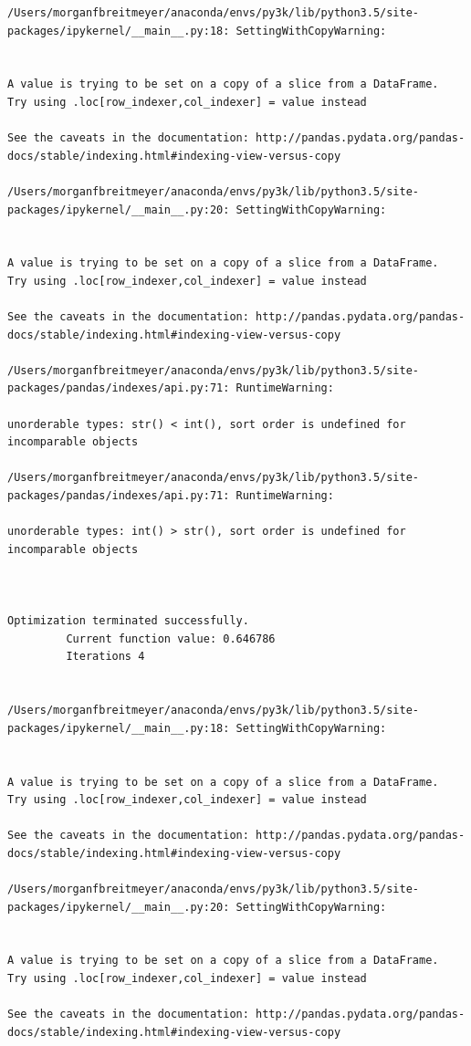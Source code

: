 \begin{lstlisting}
/Users/morganfbreitmeyer/anaconda/envs/py3k/lib/python3.5/site-packages/ipykernel/__main__.py:18: SettingWithCopyWarning:


A value is trying to be set on a copy of a slice from a DataFrame.
Try using .loc[row_indexer,col_indexer] = value instead

See the caveats in the documentation: http://pandas.pydata.org/pandas-docs/stable/indexing.html#indexing-view-versus-copy

/Users/morganfbreitmeyer/anaconda/envs/py3k/lib/python3.5/site-packages/ipykernel/__main__.py:20: SettingWithCopyWarning:


A value is trying to be set on a copy of a slice from a DataFrame.
Try using .loc[row_indexer,col_indexer] = value instead

See the caveats in the documentation: http://pandas.pydata.org/pandas-docs/stable/indexing.html#indexing-view-versus-copy

/Users/morganfbreitmeyer/anaconda/envs/py3k/lib/python3.5/site-packages/pandas/indexes/api.py:71: RuntimeWarning:

unorderable types: str() < int(), sort order is undefined for incomparable objects

/Users/morganfbreitmeyer/anaconda/envs/py3k/lib/python3.5/site-packages/pandas/indexes/api.py:71: RuntimeWarning:

unorderable types: int() > str(), sort order is undefined for incomparable objects



Optimization terminated successfully.
         Current function value: 0.646786
         Iterations 4


/Users/morganfbreitmeyer/anaconda/envs/py3k/lib/python3.5/site-packages/ipykernel/__main__.py:18: SettingWithCopyWarning:


A value is trying to be set on a copy of a slice from a DataFrame.
Try using .loc[row_indexer,col_indexer] = value instead

See the caveats in the documentation: http://pandas.pydata.org/pandas-docs/stable/indexing.html#indexing-view-versus-copy

/Users/morganfbreitmeyer/anaconda/envs/py3k/lib/python3.5/site-packages/ipykernel/__main__.py:20: SettingWithCopyWarning:


A value is trying to be set on a copy of a slice from a DataFrame.
Try using .loc[row_indexer,col_indexer] = value instead

See the caveats in the documentation: http://pandas.pydata.org/pandas-docs/stable/indexing.html#indexing-view-versus-copy


\end{lstlisting}
